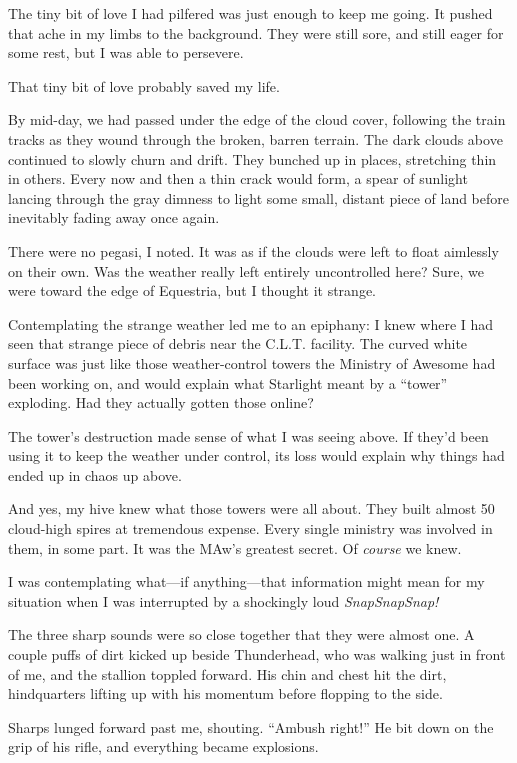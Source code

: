 {\br}%
The tiny bit of love I had pilfered was just enough to keep me going. It pushed that ache in my limbs to the background. They were still sore, and still eager for some rest, but I was able to persevere.

That tiny bit of love probably saved my life.

By mid-day, we had passed under the edge of the cloud cover, following the train tracks as they wound through the broken, barren terrain. The dark clouds above continued to slowly churn and drift. They bunched up in places, stretching thin in others. Every now and then a thin crack would form, a spear of sunlight lancing through the gray dimness to light some small, distant piece of land before inevitably fading away once again.

There were no pegasi, I noted. It was as if the clouds were left to float aimlessly on their own. Was the weather really left entirely uncontrolled here? Sure, we were toward the edge of Equestria, but I thought it strange.

Contemplating the strange weather led me to an epiphany: I knew where I had seen that strange piece of debris near the C.L.T. facility. The curved white surface was just like those weather-control towers the Ministry of Awesome had been working on, and would explain what Starlight meant by a “tower” exploding. Had they actually gotten those online?

The tower’s destruction made sense of what I was seeing above. If they’d been using it to keep the weather under control, its loss would explain why things had ended up in chaos up above.

And yes, my hive knew what those towers were all about. They built almost 50 cloud-high spires at tremendous expense. Every single ministry was involved in them, in some part. It was the MAw’s greatest secret. Of \textit{course} we knew.

I was contemplating what—if anything—that information might mean for my situation when I was interrupted by a shockingly loud \textit{SnapSnapSnap!}

The three sharp sounds were so close together that they were almost one. A couple puffs of dirt kicked up beside Thunderhead, who was walking just in front of me, and the stallion toppled forward. His chin and chest hit the dirt, hindquarters lifting up with his momentum before flopping to the side.

Sharps lunged forward past me, shouting. “Ambush right!” He bit down on the grip of his rifle, and everything became explosions.

